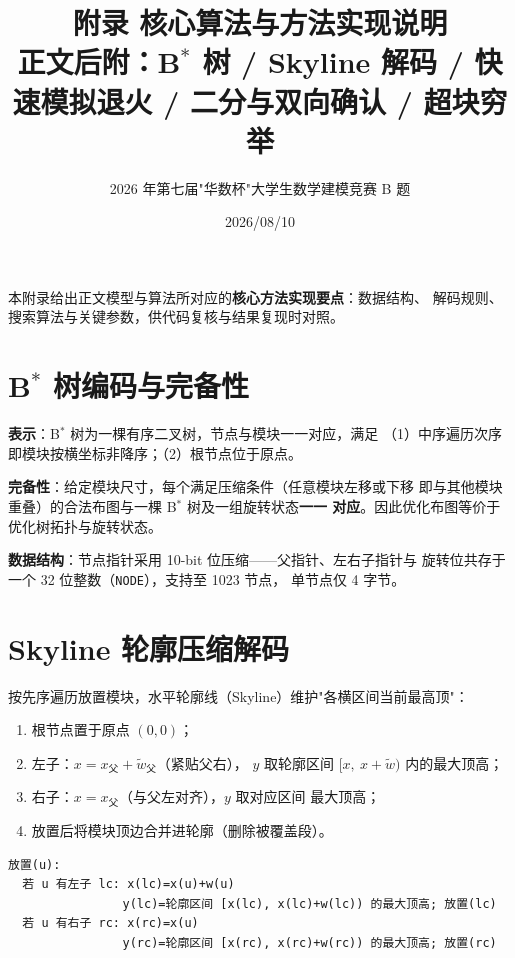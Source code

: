\documentclass[12pt,a4paper]{article}
\title{\textbf{附录 核心算法与方法实现说明}\\[6pt]
\large 正文后附：B$^*$ 树 / Skyline 解码 / 快速模拟退火 / 二分与双向确认 / 超块穷举}
\author{2026 年第七届"华数杯"大学生数学建模竞赛 B 题}
\date{2026/08/10}
\begin{document}
\maketitle

本附录给出正文模型与算法所对应的\textbf{核心方法实现要点}：数据结构、
解码规则、搜索算法与关键参数，供代码复核与结果复现时对照。

\section{B$^*$ 树编码与完备性}

\textbf{表示}：B$^*$ 树为一棵有序二叉树，节点与模块一一对应，满足
（1）中序遍历次序即模块按横坐标非降序；（2）根节点位于原点。

\textbf{完备性}：给定模块尺寸，每个满足压缩条件（任意模块左移或下移
即与其他模块重叠）的合法布图与一棵 B$^*$ 树及一组旋转状态\textbf{一一
对应}。因此优化布图等价于优化树拓扑与旋转状态。

\textbf{数据结构}：节点指针采用 10-bit 位压缩——父指针、左右子指针与
旋转位共存于一个 32 位整数（\texttt{NODE}），支持至 1023 节点，
单节点仅 4 字节。

\section{Skyline 轮廓压缩解码}

按先序遍历放置模块，水平轮廓线（Skyline）维护"各横区间当前最高顶"：

\begin{enumerate}[leftmargin=2em]
    \item 根节点置于原点 $(0,0)$；
    \item 左子：$x = x_{\text{父}} + \tilde w_{\text{父}}$（紧贴父右），
    $y$ 取轮廓区间 $[x,\ x+\tilde w)$ 内的最大顶高；
    \item 右子：$x = x_{\text{父}}$（与父左对齐），$y$ 取对应区间
    最大顶高；
    \item 放置后将模块顶边合并进轮廓（删除被覆盖段）。
\end{enumerate}

\begin{tcolorbox}[colback=gray!6, colframe=gray!50, title=解码伪代码]
{\footnotesize
\begin{verbatim}
放置(u):
  若 u 有左子 lc: x(lc)=x(u)+w(u)
                y(lc)=轮廓区间 [x(lc), x(lc)+w(lc)) 的最大顶高; 放置(lc)
  若 u 有右子 rc: x(rc)=x(u)
                y(rc)=轮廓区间 [x(rc), x(rc)+w(rc)) 的最大顶高; 放置(rc)
\end{verbatim}
}
\end{tcolorbox}
\end{document}

